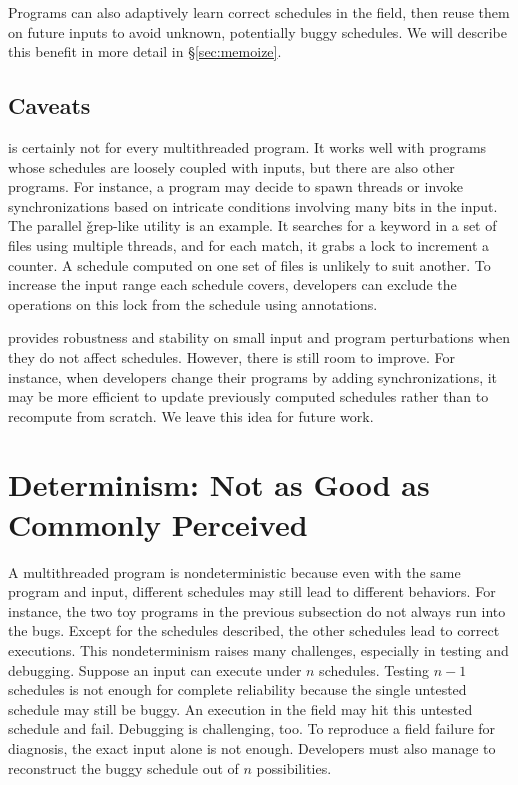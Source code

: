   Programs can also adaptively learn correct
schedules in the field, then reuse them on future inputs to avoid unknown,
potentially buggy schedules.  We will describe this benefit in more
detail in \S\ref{sec:memoize}.

\subsection{Caveats}

\smt is certainly not for every multithreaded program.  It works well with
programs whose schedules are loosely coupled with inputs, but there are also
other programs.  For instance, a program may decide to spawn
threads or invoke synchronizations based on intricate conditions involving many
bits in the input. The parallel \v{grep}-like utility \pfscan is an example.  It
searches for a keyword in a set of files using multiple threads, and for each
match, it grabs a lock to increment a counter.  A schedule computed on one set
of files is unlikely to suit another. To increase the input range each schedule
covers, developers can exclude the operations on this lock from the schedule
using annotations.


\smt provides robustness and stability on small input and program
perturbations when they do not affect schedules.  However, there
is still room to improve.  For instance, when developers change their
programs by adding synchronizations, it may be more efficient to
update previously computed schedules rather than to recompute from
scratch. We leave this idea for future work.



\section{Determinism: Not as Good as Commonly Perceived} \label{sec:smt-dmt}

A multithreaded program is nondeterministic because even with the same
program and input, different schedules may still lead to different
behaviors.  For instance, the two toy programs in the previous subsection
do not always run into the bugs.  Except for the schedules described, the
other schedules lead to correct executions. This nondeterminism raises many
challenges, especially in testing and debugging.  Suppose an input can execute
under $n$ schedules. Testing $n-1$ schedules is not enough for complete
reliability because the single untested schedule may still be buggy.  An
execution in the field may hit this untested schedule and fail.  Debugging is
challenging, too. To reproduce a field failure for diagnosis, the exact input
alone is not enough. Developers must also manage to reconstruct the buggy
schedule out of $n$ possibilities.

